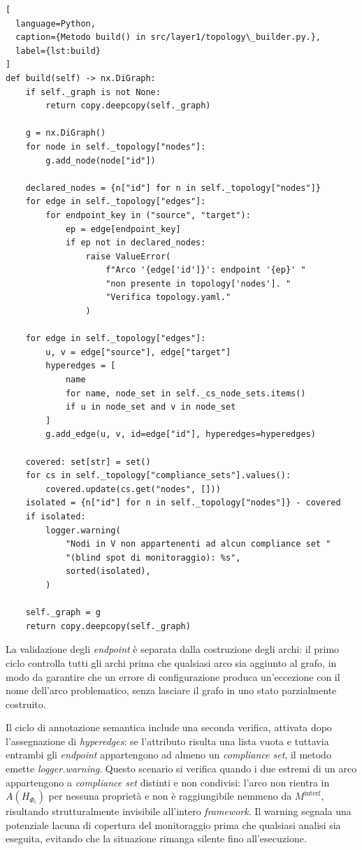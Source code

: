 \begin{lstlisting}[
  language=Python,
  caption={Metodo build() in src/layer1/topology\_builder.py.},
  label={lst:build}
]
def build(self) -> nx.DiGraph:
    if self._graph is not None:
        return copy.deepcopy(self._graph)

    g = nx.DiGraph()
    for node in self._topology["nodes"]:
        g.add_node(node["id"])

    declared_nodes = {n["id"] for n in self._topology["nodes"]}
    for edge in self._topology["edges"]:
        for endpoint_key in ("source", "target"):
            ep = edge[endpoint_key]
            if ep not in declared_nodes:
                raise ValueError(
                    f"Arco '{edge['id']}': endpoint '{ep}' "
                    "non presente in topology['nodes']. "
                    "Verifica topology.yaml."
                )

    for edge in self._topology["edges"]:
        u, v = edge["source"], edge["target"]
        hyperedges = [
            name
            for name, node_set in self._cs_node_sets.items()
            if u in node_set and v in node_set
        ]
        g.add_edge(u, v, id=edge["id"], hyperedges=hyperedges)

    covered: set[str] = set()
    for cs in self._topology["compliance_sets"].values():
        covered.update(cs.get("nodes", []))
    isolated = {n["id"] for n in self._topology["nodes"]} - covered
    if isolated:
        logger.warning(
            "Nodi in V non appartenenti ad alcun compliance set "
            "(blind spot di monitoraggio): %s",
            sorted(isolated),
        )

    self._graph = g
    return copy.deepcopy(self._graph)
\end{lstlisting}

La validazione degli \textit{endpoint} è separata dalla costruzione degli archi: il primo
ciclo controlla tutti gli archi prima che qualsiasi arco sia aggiunto al grafo, in modo da
garantire che un errore di configurazione produca un'eccezione con il nome dell'arco
problematico, senza lasciare il grafo in uno stato parzialmente costruito.

Il ciclo di annotazione semantica include una seconda verifica, attivata dopo l'assegnazione
di \textit{hyperedges}: se l'attributo risulta una lista vuota e tuttavia entrambi gli
\textit{endpoint} appartengono ad almeno un \textit{compliance set}, il metodo emette
\textit{logger.warning}. Questo scenario si verifica quando i due estremi di un arco
appartengono a \textit{compliance set} distinti e non condivisi: l'arco non rientra in
$A(H_{\Phi_i})$ per nessuna proprietà e non è raggiungibile nemmeno da
$M^{\text{interf}}$, risultando strutturalmente invisibile all'intero \textit{framework}.
Il warning segnala una potenziale lacuna di copertura del monitoraggio prima che qualsiasi
analisi sia eseguita, evitando che la situazione rimanga silente fino all'esecuzione.

